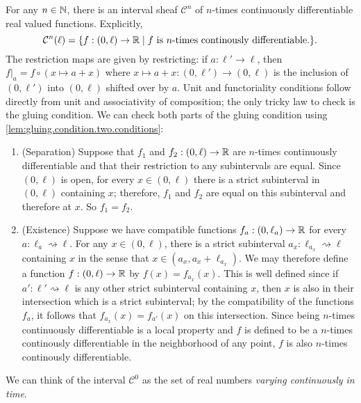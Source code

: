 \documentclass[DynamicalBook]{subfiles}
\begin{document}
\begin{example}\label{ex:sheaf.of.cont.funcs}
  For any $n \in \mathbb{N}$, there is an interval sheaf $\mathcal{C}^{n}$ of $n$-times continuously differentiable real valued functions. Explicitly,
  $$\mathcal{C}^{n}(\ell) = \{f : (0, \ell) \to \mathbb{R} \mid \mbox{$f$ is $n$-times continously differentiable.}\}.$$
  The restriction maps are given by restricting: if $a : \ell' \to \ell$, then $f|_{a} = f \circ (x \mapsto a + x)$ where $x \mapsto a + x : (0, \ell') \to (0, \ell)$ is the inclusion of $(0, \ell')$ into $(0, \ell)$ shifted over by $a$. Unit and functoriality conditions follow directly from unit and associativity of composition; the only tricky law to check is the gluing condition. We can check both parts of the gluing condition using \cref{lem:gluing.condition.two.conditions}:
  \begin{enumerate}
          \item (Separation) Suppose that $f_{1}$ and $f_{2} : (0, \ell) \to \mathbb{R}$ are $n$-times continuously differentiable and that their restriction to any subintervals are equal. Since $(0, \ell)$ is open, for every $x \in (0, \ell)$ there is a strict subinterval in $(0, \ell)$ containing $x$; therefore, $f_{1}$ and $f_{2}$ are equal on this subinterval and therefore at $x$. So $f_{1} = f_{2}$.
          \item (Existence) Suppose we have compatible functions $f_{a} : (0, \ell_{a}) \to \mathbb{R}$ for every $a : \ell_{a} \rightsquigarrow \ell$. For any $x \in (0, \ell)$, there is a strict subinterval $a_{x} : \ell_{a_{x}} \rightsquigarrow \ell$ containing $x$ in the sense that $x \in (a_{x}, a_{x} + \ell_{a_{x}})$. We may therefore define a function $f : (0, \ell) \to \mathbb{R}$ by $f(x) = f_{a_x}(x)$. This is well defined since if $a' : \ell' \rightsquigarrow \ell$ is any other strict subinterval containing $x$, then $x$ is also in their intersection which is a strict subinterval; by the compatibility of the functions $f_{a}$, it follows that $f_{a_{x}}(x) = f_{a'}(x)$ on this intersection. Since being $n$-times continuously differentiable is a local property and $f$ is defined to be a $n$-times continously differentiable in the neighborhood of any point, $f$ is also $n$-times continously differentiable.
    \end{enumerate}

    We can think of the interval $\mathcal{C}^{0}$ as the set of real numbers \emph{varying continuously in time}.
  \end{example}
\end{document}
